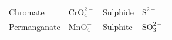 {\begin{center}
\begin{xtabular*}{\mytablewidth}[t]{|p{10\mystarwidth}|p{10\mystarwidth}|p{10\mystarwidth}|p{10\mystarwidth}|}
    
        Chromate &
    
    
        \begin{math}\mathrm{CrO}_{4}^{2-}\end{math} &
    
    
        Sulphide &
    
    
        \begin{math}{\mathrm{S}}^{2-}\end{math}%
     \tabularnewline{}
    
    
        Permanganate &
    
    
        \begin{math}\mathrm{MnO}_{4}^{-}\end{math} &
    
    
        Sulphite &
    
    
        \begin{math}\mathrm{SO}_{3}^{2-}\end{math}%
     \tabularnewline{}
    

\end{xtabular*}
\end{center}}
